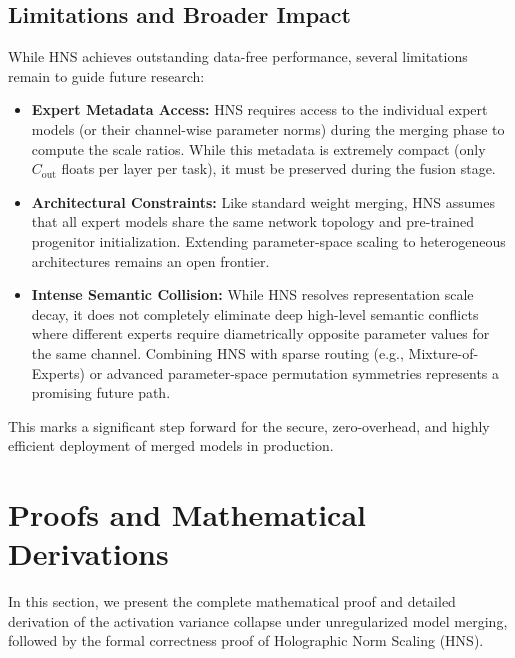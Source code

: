 \documentclass{article}
\theoremstyle{plain}
\theoremstyle{definition}
\theoremstyle{remark}
\begin{document}
\subsection{Limitations and Broader Impact}
While HNS achieves outstanding data-free performance, several limitations remain to guide future research:
\begin{itemize}
  \item \textbf{Expert Metadata Access:} HNS requires access to the individual expert models (or their channel-wise parameter norms) during the merging phase to compute the scale ratios. While this metadata is extremely compact (only $C_{\text{out}}$ floats per layer per task), it must be preserved during the fusion stage.
  \item \textbf{Architectural Constraints:} Like standard weight merging, HNS assumes that all expert models share the same network topology and pre-trained progenitor initialization. Extending parameter-space scaling to heterogeneous architectures remains an open frontier.
  \item \textbf{Intense Semantic Collision:} While HNS resolves representation scale decay, it does not completely eliminate deep high-level semantic conflicts where different experts require diametrically opposite parameter values for the same channel. Combining HNS with sparse routing (e.g., Mixture-of-Experts) or advanced parameter-space permutation symmetries represents a promising future path.
\end{itemize}
This marks a significant step forward for the secure, zero-overhead, and highly efficient deployment of merged models in production.




\newpage
\appendix
\onecolumn
\section{Proofs and Mathematical Derivations}
\label{app:proofs}

In this section, we present the complete mathematical proof and detailed derivation of the activation variance collapse under unregularized model merging, followed by the formal correctness proof of Holographic Norm Scaling (HNS).
\end{document}
